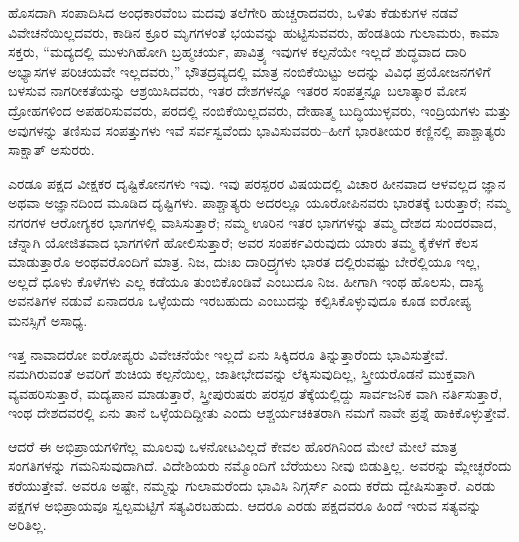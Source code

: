 \vskip 4pt

ಹೊಸದಾಗಿ ಸಂಪಾದಿಸಿದ ಅಂಧಕಾರವೆಂಬ ಮದವು ತಲೆಗೇರಿ ಹುಚ್ಚರಾದವರು, ಒಳಿತು ಕೆಡುಕುಗಳ ನಡವೆ ವಿವೇಚನೆಯಿಲ್ಲದವರು, ಕಾಡಿನ ಕ್ರೂರ ಮೃಗಗಳಂತೆ ಭಯವನ್ನು ಹುಟ್ಟಿಸುವವರು, ಹೆಂಡತಿಯ ಗುಲಾಮರು, ಕಾಮಾ ಸಕ್ತರು, “ಮದ್ಯದಲ್ಲಿ ಮುಳುಗಿಹೋಗಿ ಬ್ರಹ್ಮಚರ್ಯ, ಪಾವಿತ್ರ್ಯ ಇವುಗಳ ಕಲ್ಪನೆಯೇ ಇಲ್ಲದೆ ಶುದ್ಧವಾದ ದಾರಿ ಅಭ್ಯಾಸಗಳ ಪರಿಚಯವೇ ಇಲ್ಲದವರು,” ಭೌತದ್ರವ್ಯದಲ್ಲಿ ಮಾತ್ರ ನಂಬಿಕೆಯಿಟ್ಟು ಅದನ್ನು ವಿವಿಧ ಪ್ರಯೋಜನಗಳಿಗೆ ಬಳಸುವ ನಾಗರೀಕತೆಯನ್ನು ಆಶ್ರಯಿಸಿದವರು, ಇತರ ದೇಶಗಳನ್ನೂ ಇತರರ ಸಂಪತ್ತನ್ನೂ ಬಲಾತ್ಕಾರ ಮೋಸ ದ್ರೋಹಗಳಿಂದ ಅಪಹರಿಸುವವರು, ಪರದಲ್ಲಿ ನಂಬಿಕೆಯಿಲ್ಲದವರು, ದೇಹಾತ್ಮ ಬುದ್ಧಿಯುಳ್ಳವರು, ಇಂದ್ರಿಯಗಳು ಮತ್ತು ಅವುಗಳನ್ನು ತಣಿಸುವ ಸಂಪತ್ತುಗಳು ಇವೆ ಸರ್ವಸ್ವವೆಂದು ಭಾವಿಸುವವರು–ಹೀಗೆ ಭಾರತೀಯರ ಕಣ್ಣಿನಲ್ಲಿ ಪಾಶ್ಚಾತ್ಯರು ಸಾಕ್ಷಾತ್​ ಅಸುರರು.

\vskip 4pt

ಎರಡೂ ಪಕ್ಷದ ವೀಕ್ಷಕರ ದೃಷ್ಟಿಕೋನಗಳು ಇವು. ಇವು ಪರಸ್ಪರರ ವಿಷಯದಲ್ಲಿ ವಿಚಾರ ಹೀನವಾದ ಆಳವಲ್ಲದ ಜ್ಞಾನ ಅಥವಾ ಅಜ್ಞಾನದಿಂದ ಮೂಡಿದ ದೃಷ್ಟಿಗಳು. ಪಾಶ್ಚಾತ್ಯರು ಅದರಲ್ಲೂ ಯೂರೋಪಿನವರು ಭಾರತಕ್ಕೆ ಬರುತ್ತಾರೆ; ನಮ್ಮ ನಗರಗಳ ಆರೋಗ್ಯಕರ ಭಾಗಗಳಲ್ಲಿ ವಾಸಿಸುತ್ತಾರೆ; ನಮ್ಮ ಊರಿನ ಇತರ ಭಾಗಗಳನ್ನು ತಮ್ಮ ದೇಶದ ಸುಂದರವಾದ, ಚೆನ್ನಾಗಿ ಯೋಜಿತವಾದ ಭಾಗಗಳಿಗೆ ಹೋಲಿಸುತ್ತಾರೆ; ಅವರ ಸಂಪರ್ಕವಿರುವುದು ಯಾರು ತಮ್ಮ ಕೈಕೆಳಗೆ ಕೆಲಸ ಮಾಡುತ್ತಾರೊ ಅಂಥವರೊಂದಿಗೆ ಮಾತ್ರ. ನಿಜ, ದುಃಖ ದಾರಿದ್ರ್ಯಗಳು ಭಾರತ ದಲ್ಲಿರುವಷ್ಟು ಬೇರೆಲ್ಲಿಯೂ ಇಲ್ಲ, ಅಲ್ಲದೆ ಧೂಳು ಕೊಳೆಗಳು ಎಲ್ಲ ಕಡೆಯೂ ತುಂಬಿಕೊಂಡಿವೆ ಎಂಬುದೂ ನಿಜ. ಹೀಗಾಗಿ ಇಂಥ ಹೊಲಸು, ದಾಸ್ಯ ಅವನತಿಗಳ ನಡುವೆ ಏನಾದರೂ ಒಳ್ಳೆಯದು ಇರಬಹುದು ಎಂಬುದನ್ನು ಕಲ್ಪಿಸಿಕೊಳ್ಳುವುದೂ ಕೂಡ ಐರೋಪ್ಯ ಮನಸ್ಸಿಗೆ ಅಸಾಧ್ಯ.

ಇತ್ತ ನಾವಾದರೋ ಐರೋಪ್ಯರು ವಿವೇಚನೆಯೇ ಇಲ್ಲದೆ ಏನು ಸಿಕ್ಕಿದರೂ ತಿನ್ನುತ್ತಾರೆಂದು ಭಾವಿಸುತ್ತೇವೆ. ನಮಗಿರುವಂತೆ ಅವರಿಗೆ ಶುಚಿಯ ಕಲ್ಪನೆಯಿಲ್ಲ, ಜಾತೀಭೇದವನ್ನು ಲೆಕ್ಕಿಸುವುದಿಲ್ಲ, ಸ್ತ್ರೀಯರೊಡನೆ ಮುಕ್ತವಾಗಿ ವ್ಯವಹರಿಸುತ್ತಾರೆ, ಮದ್ಯಪಾನ ಮಾಡುತ್ತಾರೆ, ಸ್ತ್ರೀಪುರುಷರು ಪರಸ್ಪರ ತೆಕ್ಕೆಯಲ್ಲಿದ್ದು ಸಾರ್ವಜನಿಕ ವಾಗಿ ನರ್ತಿಸುತ್ತಾರೆ, ಇಂಥ ದೇಶದವರಲ್ಲಿ ಏನು ತಾನೆ ಒಳ್ಳೆಯದಿದ್ದೀತು ಎಂದು ಆಶ್ಚರ್ಯಚಕಿತರಾಗಿ ನಮಗೆ ನಾವೇ ಪ್ರಶ್ನೆ ಹಾಕಿಕೊಳ್ಳುತ್ತೇವೆ.

ಆದರೆ ಈ ಅಭಿಪ್ರಾಯಗಳಿಗೆಲ್ಲ ಮೂಲವು ಒಳನೋಟವಿಲ್ಲದೆ ಕೇವಲ ಹೊರಗಿನಿಂದ ಮೇಲೆ ಮೇಲೆ ಮಾತ್ರ ಸಂಗತಿಗಳನ್ನು ಗಮನಿಸುವುದಾಗಿದೆ. ವಿದೇಶಿಯರು ನಮ್ಮೊಂದಿಗೆ ಬೆರೆಯಲು ನೀವು ಬಿಡುತ್ತಿಲ್ಲ. ಅವರನ್ನು ಮ್ಲೇಚ್ಛರೆಂದು ಕರೆಯುತ್ತೇವೆ. ಅವರೂ ಅಷ್ಟೇ, ನಮ್ಮನ್ನು ಗುಲಾಮರೆಂದು ಭಾವಿಸಿ ನಿಗ್ಗರ್ಸ್​ ಎಂದು ಕರೆದು ದ್ವೇಷಿಸುತ್ತಾರೆ. ಎರಡು ಪಕ್ಷಗಳ ಅಭಿಪ್ರಾಯವೂ ಸ್ವಲ್ಪಮಟ್ಟಿಗೆ ಸತ್ಯವಿರಬಹುದು. ಆದರೂ ಎರಡು ಪಕ್ಷದವರೂ ಹಿಂದೆ ಇರುವ ಸತ್ಯವನ್ನು ಅರಿತಿಲ್ಲ.

